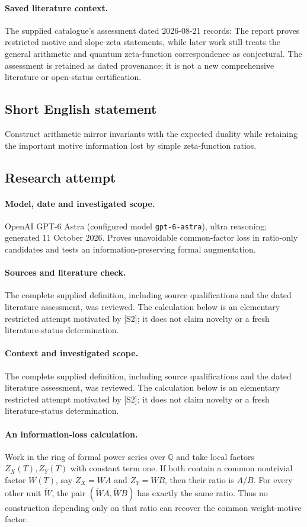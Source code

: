 \documentclass[11pt]{article}
\begin{document}
\paragraph{Saved literature context.} The supplied catalogue's assessment dated 2026-08-21 records: The report proves restricted motive and slope-zeta statements, while later work still treats the general arithmetic and quantum zeta-function correspondence as conjectural. The assessment is retained as dated provenance; it is not a new comprehensive literature or open-status certification.
\subsection{Short English statement}
Construct arithmetic mirror invariants with the expected duality while retaining the important motive information lost by simple zeta-function ratios.
\subsection{Research attempt}
\paragraph{Model, date and investigated scope.}
OpenAI GPT-6 Astra (configured model \texttt{gpt-6-astra}), ultra reasoning; generated 11 October 2026. Proves unavoidable common-factor loss in ratio-only candidates and tests an information-preserving formal augmentation.

\paragraph{Sources and literature check.}
The complete supplied definition, including source qualifications and the dated literature assessment, was reviewed. The calculation below is an elementary restricted attempt motivated by [S2]; it does not claim novelty or a fresh literature-status determination.

\paragraph{Context and investigated scope.} The complete supplied definition, including source qualifications and the dated literature assessment, was reviewed. The calculation below is an elementary restricted attempt motivated by [S2]; it does not claim novelty or a fresh literature-status determination.

\paragraph{An information-loss calculation.} Work in the ring of formal power series over $\mathbb Q$ and take local factors $Z_X(T),Z_Y(T)$ with constant term one. If both contain a common nontrivial factor $W(T)$, say $Z_X=WA$ and $Z_Y=WB$, then their ratio is $A/B$. For every other unit $\widetilde W$, the pair $(\widetilde W A,\widetilde W B)$ has exactly the same ratio. Thus no construction depending only on that ratio can recover the common weight-motive factor.
\end{document}
